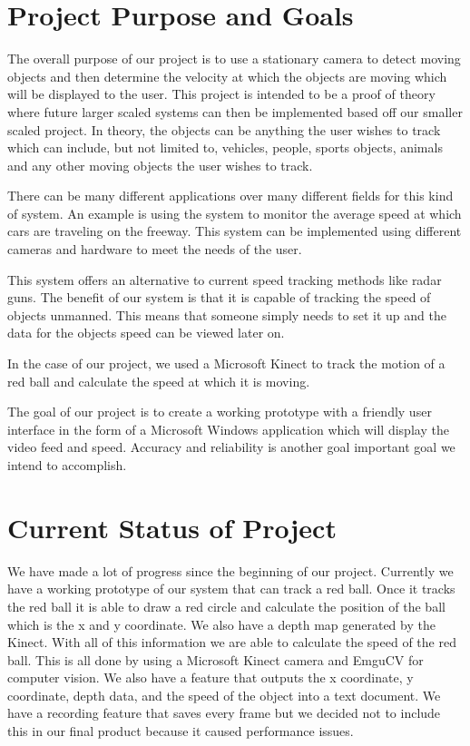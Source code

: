 \documentclass[onecolumn, draftclsnofoot,10pt, compsoc]{IEEEtran}
\begin{document}
\section{Project Purpose and Goals}
The overall purpose of our project is to use a stationary camera to detect moving objects and then determine the velocity at which the objects are moving which will be displayed to the user.
This project is intended to be a proof of theory where future larger scaled systems can then be implemented based off our smaller scaled project.
In theory, the objects can be anything the user wishes to track which can include, but not limited to, vehicles, people, sports objects, animals and any other moving objects the user wishes to track.

There can be many different applications over many different fields for this kind of system.
An example is using the system to monitor the average speed at which cars are traveling on the freeway.
This system can be implemented using different cameras and hardware to meet the needs of the user.

This system offers an alternative to current speed tracking methods like radar guns.
The benefit of our system is that it is capable of tracking the speed of objects unmanned.
This means that someone simply needs to set it up and the data for the objects speed can be viewed later on.

In the case of our project, we used a Microsoft Kinect to track the motion of a red ball and calculate the speed at which it is moving.

The goal of our project is to create a working prototype with a friendly user interface in the form of a Microsoft Windows application which will display the video feed and speed.
Accuracy and reliability is another goal important goal we intend to accomplish.

\section{Current Status of Project}
We have made a lot of progress since the beginning of our project. Currently we have a working prototype of our system that can track a red ball. Once it tracks the red ball it is able to draw a red circle and calculate the position of the ball which is the x and y coordinate. We also have a depth map generated by the Kinect. With all of this information we are able to calculate the speed of the red ball. This is all done by using a Microsoft Kinect camera and EmguCV for computer vision. We also have a feature that outputs the x coordinate, y coordinate, depth data, and the speed of the object into a text document. We have a recording feature that saves every frame but we decided not to include this in our final product because it caused performance issues.
\end{document}
